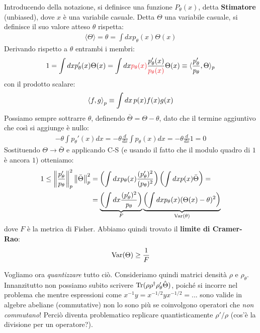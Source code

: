 \documentclass[../../InformazioneQuantistica.tex]{subfiles}
\begin{document}
Introducendo della notazione, si definisce una funzione $P_\theta(x)$, detta \textbf{Stimatore} (unbiased), dove $x$ è una variabile casuale. Detta $\Theta$ una variabile casuale, si definisce il suo valore atteso $\theta$ rispetta:
\begin{align*}
\langle \Theta \rangle = \theta = \int dx p_\theta(x) \Theta(x)
\end{align*}
Derivando rispetto a $\theta$ entrambi i membri:
\begin{align*}
1 = \int dx p_\theta'(x) \Theta(x) = \int dx \textcolor{Red}{p_\theta(x)} \frac{p_\theta'(x)}{\textcolor{Red}{p_\theta(x)}}\Theta(x) \equiv  \langle \frac{p_\theta'}{p_\theta},\Theta \rangle_p
\end{align*}
con il prodotto scalare:
\begin{align*}
\Braket{f,g}_p \equiv \int dx\, p(x)f(x)g(x)
\end{align*}
Possiamo sempre sottrarre $\theta$, definendo $\bar{\Theta}=\Theta -\theta$, dato che il termine aggiuntivo che così si aggiunge è nullo:
\begin{align*}
-\theta\int p_\theta'(x)dx = -\theta \frac{d}{dx}\int p_\theta(x)dx = -\theta \frac{d}{dx} 1 = 0 
\end{align*}
Sostituendo $\Theta \to \bar{\Theta}$ e applicando C-S (e usando il fatto che il modulo quadro di $1$ è ancora $1$) otteniamo:
\begin{align*}
1 \leq \left\lVert\frac{p_\theta'}{p_\theta}\right\rVert^2_p \left\lVert\bar{\Theta}\right\rVert_p^2 &= \left( \int dx p_\theta(x) \frac{(p'_\theta)^2}{(p_\theta)^2} \right) \left(\int dx p(x) \bar{\Theta} \right) =\\
&=\underbrace{ \left( \int dx \frac{(p'_\theta)^2}{p_\theta} \right)}_{F} \underbrace{\left( \int dx p_\theta(x) (\Theta(x)-\theta)^2 \right)}_{\operatorname{Var}(\theta)}
\end{align*}
dove $F$ è la metrica di Fisher. Abbiamo quindi trovato il \textbf{limite di Cramer-Rao}:
\begin{align*}
\operatorname{Var}(\Theta) \geq \frac{1}{F}
\end{align*}

Vogliamo ora \textit{quantizzare} tutto ciò. Consideriamo quindi matrici densità $\rho$ e $\rho_\theta$. Innanzitutto non possiamo subito scrivere $\operatorname{Tr}(\rho \rho^\dag \rho_\theta' \hat\Theta)$, poiché si incorre nel problema che mentre espressioni come $x^{-1}y=x^{-1/2}yx^{-1/2}=...$ sono valide in algebre abeliane (commutative) non lo sono più se coinvolgono operatori che \textit{non commutano}! Perciò diventa problematico replicare quantisticamente $\rho'/\rho$ (cos'è la divisione per un operatore?).\\
\end{document}
